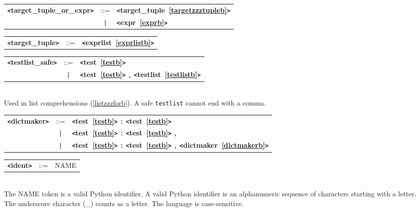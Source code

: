 \label{targetzzztuplezzzorzzzexprb}
\begin{tabular}{lcl}
{\bf \verb+<+target\_tuple\_or\_expr\verb+>+} & ::=  & {\bf \verb+<+target\_tuple~\ref{targetzzztupleb}\verb+>+}  \\
 & \verb+|+  & {\bf \verb+<+expr~\ref{exprb}\verb+>+}  \\
\end{tabular}

\label{targetzzztupleb}
\begin{tabular}{lcl}
{\bf \verb+<+target\_tuple\verb+>+} & ::=  & {\bf \verb+<+exprlist~\ref{exprlistb}\verb+>+}  \\
\end{tabular}

\label{testlistzzzsafeb}
\begin{tabular}{lcl}
{\bf \verb+<+testlist\_safe\verb+>+} & ::=  & {\bf \verb+<+test~\ref{testb}\verb+>+}  \\
 & \verb+|+  & {\bf \verb+<+test~\ref{testb}\verb+>+}  \verb|,| {\bf \verb+<+testlist~\ref{testlistb}\verb+>+}  \\
\end{tabular} \\

Used in list comprehensions (\ref{listzzzforb}).  A safe \verb|testlist| cannot end with a comma.

\label{dictmakerb}
\begin{tabular}{lcl}
{\bf \verb+<+dictmaker\verb+>+} & ::=  & {\bf \verb+<+test~\ref{testb}\verb+>+}  \verb|:| {\bf \verb+<+test~\ref{testb}\verb+>+}  \\
 & \verb+|+  & {\bf \verb+<+test~\ref{testb}\verb+>+}  \verb|:| {\bf \verb+<+test~\ref{testb}\verb+>+}  \verb|,| \\
 & \verb+|+  & {\bf \verb+<+test~\ref{testb}\verb+>+}  \verb|:| {\bf \verb+<+test~\ref{testb}\verb+>+}  \verb|,| {\bf \verb+<+dictmaker~\ref{dictmakerb}\verb+>+}  \\
\end{tabular}

\label{identb}
\begin{tabular}{lcl}
{\bf \verb+<+ident\verb+>+} & ::=  & NAME \\
\end{tabular} \\

The NAME token is a valid Python identifier.  A valid Python identifier is an alphanumeric sequence of characters starting with a letter.  The underscore character (\_) counts as a letter.  The language is case-sensitive.
